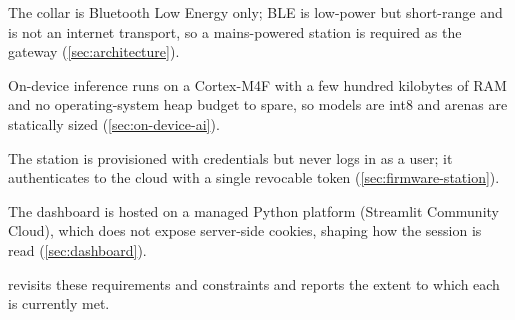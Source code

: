 \begin{description}[leftmargin=1.6em,style=nextline]
  \item[Radio.] The collar is Bluetooth Low Energy only; BLE is low-power but short-range and is not
        an internet transport, so a mains-powered station is required as the gateway
        (\cref{sec:architecture}).
  \item[Compute.] On-device inference runs on a Cortex-M4F with a few hundred kilobytes of RAM and no
        operating-system heap budget to spare, so models are int8 and arenas are statically sized
        (\cref{sec:on-device-ai}).
  \item[Connectivity.] The station is provisioned with credentials but never logs in as a user; it
        authenticates to the cloud with a single revocable token (\cref{sec:firmware-station}).
  \item[Hosting.] The dashboard is hosted on a managed Python platform (Streamlit Community Cloud),
        which does not expose server-side cookies, shaping how the session is read
        (\cref{sec:dashboard}).
\end{description}

 revisits these requirements and constraints and reports the extent to which
each is currently met.
